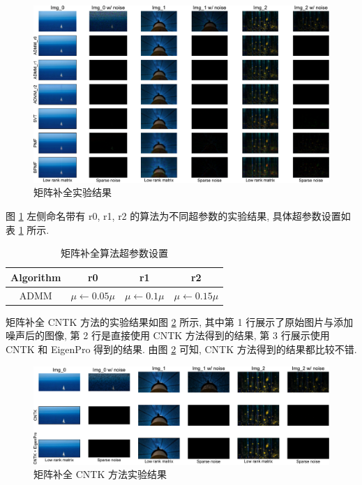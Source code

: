 \documentclass[12pt]{article}
\begin{document}
\begin{figure}[!htbp]
  \centering
  \includegraphics[width=17cm]{matrix_completion.pdf}
  \caption{矩阵补全实验结果}
  \label{fig:results_mc}
\end{figure}

图 \ref{fig:results_mc} 左侧命名带有 \textsf{r0}, \textsf{r1}, \textsf{r2} 的算法为不同超参数的实验结果, 具体超参数设置如表 \ref{tab:mc_hyperparams} 所示.

\begin{table}[!htbp]
  \centering
  \small
  \caption{矩阵补全算法超参数设置}
  \label{tab:mc_hyperparams}
  \begin{tabular}{cccc}
    \toprule
    Algorithm  & \textsf{r0}  & \textsf{r1} & \textsf{r2}  \\
    \midrule
    ADMM & $\mu\leftarrow0.05\mu$ & $\mu\leftarrow0.1\mu$ & $\mu\leftarrow0.15\mu$ \\
    \bottomrule
  \end{tabular}
\end{table}

矩阵补全 CNTK 方法的实验结果如图 \ref{fig:results_mc_ntk} 所示, 其中第 1 行展示了原始图片与添加噪声后的图像, 第 2 行是直接使用 CNTK 方法得到的结果, 第 3 行展示使用 CNTK 和 EigenPro 得到的结果. 由图 \ref{fig:results_mc_ntk} 可知, CNTK 方法得到的结果都比较不错.

\begin{figure}[!htbp]
  \centering
  \includegraphics[width=17cm]{matrix_completion_ntk.pdf}
  \caption{矩阵补全 CNTK 方法实验结果}
  \label{fig:results_mc_ntk}
\end{figure}
\end{document}
